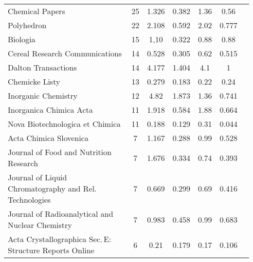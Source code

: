{\begin{longtable}[c]{lcccccc}
  Chemical Papers                                                                    & 25     & 1.326   & 0.382 &  1.36      & 0.56                  \\
  Polyhedron                                                                         & 22     & 2.108   & 0.592 &  2.02      & 0.777                 \\
  Biologia                                                                           & 15     & 1,10    & 0.322 &  0.88      & 0.88                  \\
  Cereal Research Communications                                                     & 14     & 0.528   & 0.305 &  0.62      & 0.515                 \\
  Dalton Transactions                                                                & 14     & 4.177   & 1.404 &  4.1       & 1                     \\[1ex]
  Chemicke Listy                                                                     & 13     & 0.279   & 0.183 &  0.22      & 0.24                  \\
  Inorganic Chemistry                                                                & 12     & 4.82    & 1.873 &  1.36      & 0.741                 \\
  Inorganica Chimica Acta                                                            & 11     & 1.918   & 0.584 &  1.88      & 0.664                 \\
  Nova Biotechnologica et Chimica                                                    & 11     & 0.188   & 0.129 &  0.31      & 0.044                 \\
  Acta Chimica Slovenica                                                             & 7      & 1.167   & 0.288 &  0.99      & 0.528                 \\[1ex]
  Journal of Food and Nutrition Research                                             & 7      & 1.676   & 0.334 &  0.74      & 0.393                 \\
  Journal of Liquid Chromatography and Rel. Technologies                             & 7      & 0.669   & 0.299 &  0.69      & 0.416                 \\
  Journal of Radioanalytical and Nuclear Chemistry                                     & 7      & 0.983   & 0.458 &  0.99      & 0.683                 \\
  Acta Crystallographica Sec.\,E: Structure Reports Online                           & 6      & 0.21    & 0.179 &  0.17      & 0.106                 \\

\end{longtable}}
